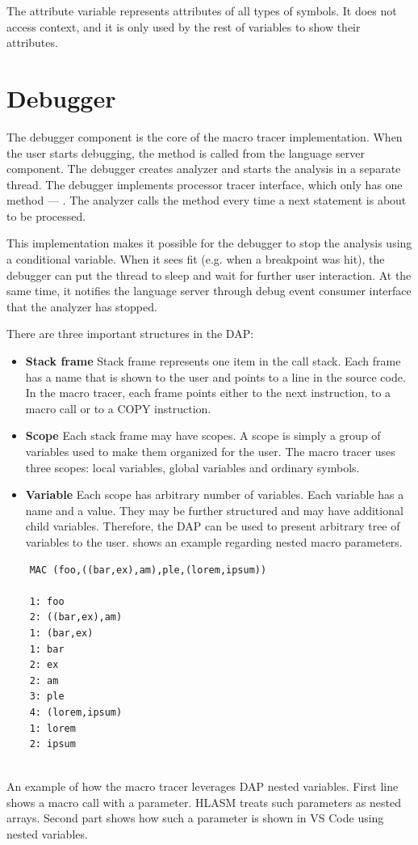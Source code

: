 The attribute variable represents attributes of all types of symbols. It does not access context, and it is only used by the rest of variables to show their attributes.

\section{Debugger}

The debugger component is the core of the macro tracer implementation. When the user starts debugging, the method  is called from the language server component. The debugger creates analyzer and starts the analysis in a separate thread. The debugger implements processor tracer interface, which only has one method --- . The analyzer calls the  method every time a next statement is about to be processed.

This implementation makes it possible for the debugger to stop the analysis using a conditional variable. When it sees fit (e.g. when a breakpoint was hit), the debugger can put the thread to sleep and wait for further user interaction. At the same time, it notifies the language server through debug event consumer interface that the analyzer has stopped.

There are three important structures in the DAP:
\begin{itemize}
	\item \textbf{Stack frame} Stack frame represents one item in the call stack. Each frame has a name that is shown to the user and points to a line in the source code. In the macro tracer, each frame points either to the next instruction, to a macro call or to a COPY instruction.
	\item \textbf{Scope} Each stack frame may have scopes. A scope is simply a group of variables used to make them organized for the user. The macro tracer uses three scopes: local variables, global variables and ordinary symbols.
	\item \textbf{Variable} Each scope has arbitrary number of variables. Each variable has a name and a value. They may be further structured and may have additional child variables. Therefore, the DAP can be used to present arbitrary tree of variables to the user.  shows an example regarding nested macro parameters.

\end{itemize}

\begin{listing}
	
	\begin{verbatim}
	MAC (foo,((bar,ex),am),ple,(lorem,ipsum))
	
	1: foo
	2: ((bar,ex),am)
	1: (bar,ex)
	1: bar
	2: ex
	2: am
	3: ple
	4: (lorem,ipsum)
	1: lorem
	2: ipsum
	
	\end{verbatim}
	\caption{An example of how the macro tracer leverages DAP nested variables. First line shows a macro call with a parameter. HLASM treats such parameters as nested arrays. Second part shows how such a parameter is shown in VS Code using nested variables.}
	\label{dap_nested_variables}
\end{listing}

